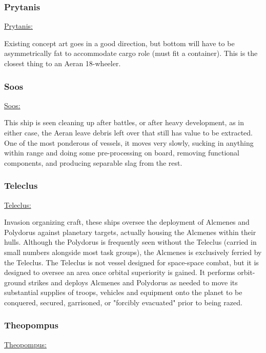 \subsubsection{Prytanis}
\href{http://vegastrike.sourceforge.net/wiki/Vessel:Prytanis}{Prytanis:}

Existing concept art goes in a good direction, but bottom will have to
be asymmetrically fat to accommodate cargo role (must fit a
container). This is the closest thing to an Aeran 18-wheeler.


\subsubsection{Soos}
\href{http://vegastrike.sourceforge.net/wiki/Vessel:Soos}{Soos:}

This ship is seen cleaning up after battles, or after heavy
development, as in either case, the Aeran leave debris left over that
still has value to be extracted. One of the most ponderous of vessels,
it moves very slowly, sucking in anything within range and doing some
pre-processing on board, removing functional components, and producing
separable slag from the rest.



\subsubsection{Teleclus}
\href{http://vegastrike.sourceforge.net/wiki/Vessel:Teleclus}{Teleclus:}

Invasion organizing craft, these ships oversee the deployment of
Alcmenes and Polydorus against planetary targets, actually housing the
Alcmenes within their hulls. Although the Polydorus is frequently seen
without the Teleclus (carried in small numbers alongside most task
groups), the Alcmenes is exclusively ferried by the Teleclus. The
Teleclus is not vessel designed for space-space combat, but it is
designed to oversee an area once orbital superiority is gained. It
performs orbit-ground strikes and deploys Alcmenes and Polydorus as
needed to move its substantial supplies of troops, vehicles and
equipment onto the planet to be conquered, secured, garrisoned, or
"forcibly evacuated" prior to being razed.


\subsubsection{Theopompus}
\href{http://vegastrike.sourceforge.net/wiki/Vessel:Theopompus}{Theopompus:}

